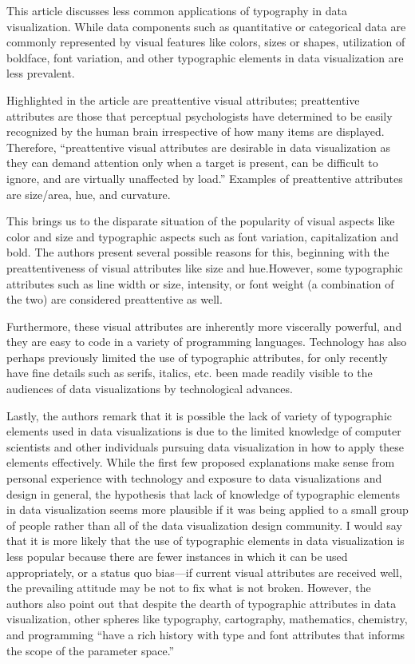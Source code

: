 \documentclass[]{book}
\theoremstyle{definition}
\theoremstyle{definition}
\theoremstyle{definition}
\theoremstyle{remark}
\begin{document}
This article discusses less common applications of typography in data
visualization. While data components such as quantitative or categorical
data are commonly represented by visual features like colors, sizes or
shapes, utilization of boldface, font variation, and other typographic
elements in data visualization are less prevalent.

Highlighted in the article are preattentive visual attributes;
preattentive attributes are those that perceptual psychologists have
determined to be easily recognized by the human brain irrespective of
how many items are displayed. Therefore, ``preattentive visual
attributes are desirable in data visualization as they can demand
attention only when a target is present, can be difficult to ignore, and
are virtually unaffected by load.'' Examples of preattentive attributes
are size/area, hue, and curvature.

This brings us to the disparate situation of the popularity of visual
aspects like color and size and typographic aspects such as font
variation, capitalization and bold. The authors present several possible
reasons for this, beginning with the preattentiveness of visual
attributes like size and hue.However, some typographic attributes such
as line width or size, intensity, or font weight (a combination of the
two) are considered preattentive as well.

Furthermore, these visual attributes are inherently more viscerally
powerful, and they are easy to code in a variety of programming
languages. Technology has also perhaps previously limited the use of
typographic attributes, for only recently have fine details such as
serifs, italics, etc. been made readily visible to the audiences of data
visualizations by technological advances.

Lastly, the authors remark that it is possible the lack of variety of
typographic elements used in data visualizations is due to the limited
knowledge of computer scientists and other individuals pursuing data
visualization in how to apply these elements effectively. While the
first few proposed explanations make sense from personal experience with
technology and exposure to data visualizations and design in general,
the hypothesis that lack of knowledge of typographic elements in data
visualization seems more plausible if it was being applied to a small
group of people rather than all of the data visualization design
community. I would say that it is more likely that the use of
typographic elements in data visualization is less popular because there
are fewer instances in which it can be used appropriately, or a status
quo bias---if current visual attributes are received well, the
prevailing attitude may be not to fix what is not broken. However, the
authors also point out that despite the dearth of typographic attributes
in data visualization, other spheres like typography, cartography,
mathematics, chemistry, and programming ``have a rich history with type
and font attributes that informs the scope of the parameter space.''
\end{document}
